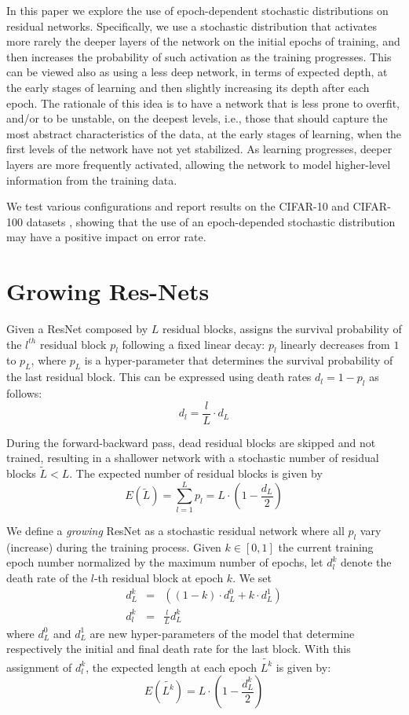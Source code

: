 \documentclass{sig-alternate}
\begin{document}
In this paper we explore the use of epoch-dependent stochastic distributions on residual networks.
Specifically, we use a stochastic distribution that activates more rarely the deeper layers of the network on the initial epochs of training, and then increases the probability of such activation as the training progresses. 
This can be viewed also as using a less deep network, in terms of expected depth, at the early stages of learning and then slightly increasing its depth after each epoch.
The rationale of this idea is to have a network that is less prone to overfit, and/or to be unstable, on the deepest levels, i.e., those that should capture the 
most abstract characteristics of the data,
at the early stages of learning, when the first levels of the network have not yet stabilized.
As learning progresses, deeper layers are more frequently activated, allowing the network to model higher-level information from the training data.

We test various configurations and report results on the CIFAR-10 and CIFAR-100 datasets \cite{krizhevsky2009learning}, showing that the use of an epoch-depended stochastic distribution may have a positive impact on error rate.

\section{Growing Res-Nets}
Given a ResNet composed by $L$ residual blocks, \cite{huang2016deep} assigns the survival
probability of the $l^{th}$ residual block $p_l$ following a fixed linear decay:
$p_l$ linearly decreases from $1$ to $p_L$, where $p_L$ is a hyper-parameter that determines the survival probability of the last residual block.
This can be expressed using death rates $d_l = 1 - p_l$ as follows:
$$	
d_l=\frac{l}{L} \cdot d_L
$$

During the forward-backward pass, dead residual blocks are skipped and not trained, resulting in a shallower network with a stochastic number of residual blocks $\tilde{L} < L$. 
The expected number of residual blocks is given by
$$
E(\tilde{L}) = \sum_{l=1}^{L} p_l = L \cdot \left ( 1 - \frac{d_L}{2} \right )
$$

We define a \textit{growing} ResNet as a stochastic residual network where all $p_l$ vary (increase) during the training process.
Given $k \in [0,1]$ the current training epoch number normalized by the maximum number of epochs, let $d_l^k$ denote the death rate of the $l$-th residual block at epoch $k$. 
We set
\begin{eqnarray} 
d_L^k &=& \left ( (1-k) \cdot d_L^0 + k \cdot d_L^1 \right ) \\
d_l^k &=& \frac{l}{L} d_L^k \label{eq:grow}
\end{eqnarray}
where $d_L^0$ and $d_L^1$ are new hyper-parameters of the model that determine respectively the initial and final death rate for the last block. 
With this assignment of $d_l^k$, the expected length at each epoch $\tilde{L^k}$ is given by:
$$
E(\tilde{L^k}) = L \cdot \left ( 1 - \frac{d_L^k}{2} \right )
$$
\end{document}
